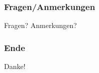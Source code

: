 \documentclass[8pt, aspectratio=169]{beamer}
\begin{document}
\begin{frame}
	\frametitle{Fragen/Anmerkungen}
	\vspace{-1.5cm}\hspace{-0.5cm}
	\begin{minipage}[t]{\textwidth}
		\centering\Huge
		Fragen? Anmerkungen?
	\end{minipage}
\end{frame}

\begin{frame}
	\frametitle{Ende}
	\vspace{-1.5cm}\hspace{-0.5cm}
	\begin{minipage}[t]{\textwidth}
		\centering\Huge
		Danke!
	\end{minipage}
\end{frame}
\end{document}
